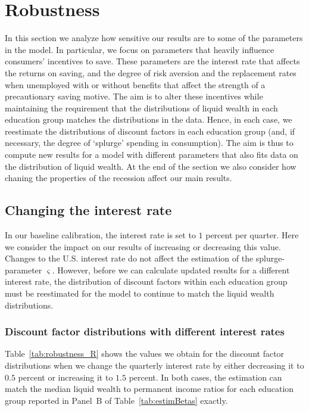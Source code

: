 \documentclass[../HAFiscal]{subfiles}
\begin{document}
\FloatBarrier
\section{Robustness}
\label{sec:robustness}

In this section we analyze how sensitive our results are to some of the parameters in the model. In particular, we focus on parameters that heavily influence consumers' incentives to save. These parameters are the interest rate that affects the returns on saving, and the degree of risk aversion and the replacement rates when unemployed with or without benefits that affect the strength of a precautionary saving motive. The aim is to alter these incentives while maintaining the requirement that the distributions of liquid wealth in each education group matches the distributions in the data. Hence, in each case, we reestimate the distributions of discount factors in each education group (and, if necessary, the degree of `splurge' spending in consumption). The aim is thus to compute new results for a model with different parameters that also fits data on the distribution of liquid wealth. At the end of the section we also consider how chaning the properties of the recession affect our main results. 

\subsection{Changing the interest rate}
\label{sec:robust_R} 
In our baseline calibration, the interest rate is set to $1$ percent per quarter. Here we consider the impact on our results of increasing or decreasing this value. Changes to the U.S. interest rate do not affect the estimation of the splurge-parameter $\varsigma$. However, before we can calculate updated results for a different interest rate, the distribution of discount factors within each education group must be reestimated for the model to continue to match the liquid wealth distributions. 

\subsubsection{Discount factor distributions with different interest rates}
\label{sec:robust_R_estim}

Table~\ref{tab:robustness_R} shows the values we obtain for the discount factor distributions when we change the quarterly interest rate by either decreasing it to $0.5$ percent or increasing it to $1.5$ percent. In both cases, the estimation can match the median liquid wealth to permanent income ratios for each education group reported in Panel~B of Table~\ref{tab:estimBetas} exactly. 
\end{document}

